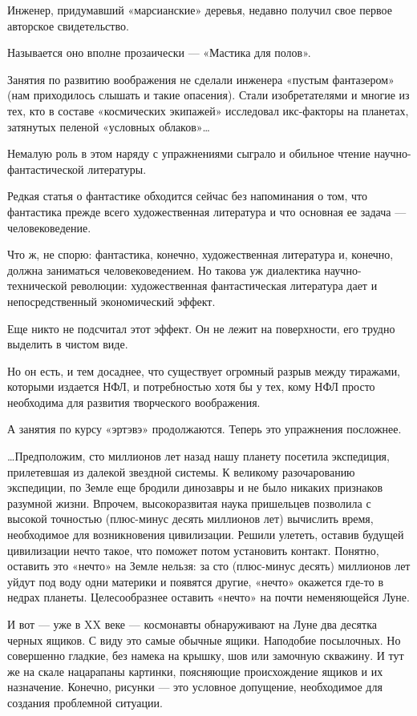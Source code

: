 Инженер, придумавший «марсианские»  деревья, недавно  получил свое  первое
авторское свидетельство.

Называется оно вполне прозаически — «Мастика для полов».

Занятия по развитию  воображения не сделали  инженера «пустым  фантазером»
(нам приходилось слышать и такие опасения). Стали изобретателями и  многие
из тех, кто  в составе  «космических экипажей»  исследовал икс-факторы  на
планетах, затянутых пеленой «условных облаков»…

Немалую роль  в  этом наряду  с  упражнениями сыграло  и  обильное  чтение
научно-фантастической литературы.

Редкая статья о  фантастике обходится  сейчас без напоминания  о том,  что
фантастика прежде всего художественная литература и что основная ее задача
— человековедение.

Что  ж,  не  спорю:  фантастика,  конечно,  художественная  литература  и,
конечно, должна  заниматься  человековедением.  Но  такова  уж  диалектика
научно-технической  революции:  художественная  фантастическая  литература
дает и непосредственный экономический эффект.

Еще никто не подсчитал этот эффект. Он не лежит на поверхности, его трудно
выделить в чистом виде.

Но он есть, и тем досаднее, что существует огромный разрыв между тиражами,
которыми издается  НФЛ, и  потребностью хотя  бы у  тех, кому  НФЛ  просто
необходима для развития творческого воображения.

А занятия по курсу «эртэвэ» продолжаются. Теперь это упражнения посложнее.

…Предположим, сто  миллионов лет  назад нашу планету  посетила экспедиция,
прилетевшая  из   далекой  звездной  системы.  К   великому  разочарованию
экспедиции, по  Земле еще  бродили динозавры и  не было  никаких признаков
разумной  жизни.  Впрочем,  высокоразвитая наука  пришельцев  позволила  с
высокой  точностью  (плюс-минус  десять миллионов  лет)  вычислить  время,
необходимое для возникновения цивилизации. Решили улететь, оставив будущей
цивилизации нечто  такое, что  поможет потом установить  контакт. Понятно,
оставить это «нечто» на Земле нельзя: за сто (плюс-минус десять) миллионов
лет  уйдут под  воду одни  материки  и появятся  другие, «нечто»  окажется
где-то  в  недрах  планеты.   Целесообразнее  оставить  «нечто»  на  почти
неменяющейся Луне.

И вот — уже в XX веке — космонавты обнаруживают на Луне два десятка черных
ящиков.  С  виду  это  самые  обычные  ящики.  Наподобие  посылочных.   Но
совершенно гладкие, без намека на крышку, шов или замочную скважину. И тут
же на  скале нацарапаны  картинки, поясняющие  происхождение ящиков  и  их
назначение. Конечно,  рисунки —  это условное  допущение, необходимое  для
создания проблемной ситуации.

